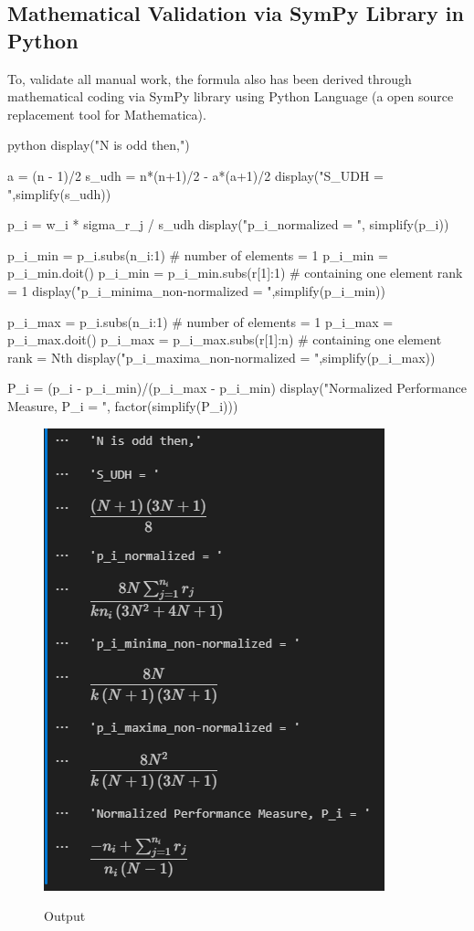 \documentclass[man,floatsintext]{apa7}
\begin{document}
\subsection{Mathematical Validation via SymPy Library in Python}
To, validate all manual work, the formula also has been derived through mathematical coding via SymPy library using Python Language (a open source replacement tool for Mathematica).

\begin{mintedbox}{python}
	display("N is odd then,")
	
	a = (n - 1)/2
	s_udh = n*(n+1)/2 - a*(a+1)/2
	display("S_UDH = ",simplify(s_udh))
	
	p_i = w_i * sigma_r_j / s_udh
	display("p_i_normalized = ", simplify(p_i))
	
	p_i_min = p_i.subs({n_i:1}) # number of elements = 1
	p_i_min = p_i_min.doit()
	p_i_min = p_i_min.subs({r[1]:1}) # containing one element rank = 1
	display("p_i_minima_non-normalized = ",simplify(p_i_min))
	
	p_i_max = p_i.subs({n_i:1}) # number of elements = 1
	p_i_max = p_i_max.doit()
	p_i_max = p_i_max.subs({r[1]:n}) # containing one element rank = Nth
	display("p_i_maxima_non-normalized = ",simplify(p_i_max))
	
	P_i = (p_i - p_i_min)/(p_i_max - p_i_min)
	display("Normalized Performance Measure, P_i = ", factor(simplify(P_i)))
\end{mintedbox}

\begin{figure}[!htb]
	\caption{Output}
	\centering
	\includegraphics [scale=1]{images/output-mathematical-validation.png}
	\label{fig:output-mathematical-validation}
\end{figure}
\end{document}
